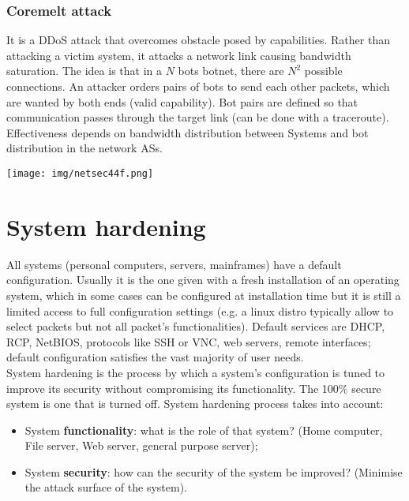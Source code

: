 \documentclass[a4paper, 10pt, titlepage]{article}
\begin{document}
\subsubsection*{Coremelt attack}
It is a DDoS attack that overcomes obstacle posed by capabilities. Rather than attacking a victim system, it attacks a network link causing bandwidth saturation. The idea is that in a $N$ bots botnet, there are $N^2$ possible connections. An attacker orders pairs of bots to send each other packets, which are wanted by both ends (valid capability). Bot pairs are defined so that communication passes through the target link (can be done with a traceroute).
Effectiveness depends on bandwidth distribution between Systems and bot distribution in the network ASs.
\begin{center}
	\texttt{[image: img/netsec44f.png]}
\end{center}

\newpage
\section{System hardening}
All systems (personal computers, servers, mainframes) have a default configuration. Usually it is the one given with a fresh installation of an operating system, which in some cases can be configured at installation time but it is still a limited access to full configuration settings (e.g. a linux distro typically allow to select packets but not all packet's functionalities). Default services are DHCP, RCP, NetBIOS, protocols like SSH or VNC, web servers, remote interfaces; default configuration satisfies the vast majority of user
needs. \\
System hardening is the process by which a system’s configuration is tuned to improve its security without compromising its functionality. The 100\% secure system is one that is turned off. System hardening process takes into account:
\begin{itemize}
	\item System \textbf{functionality}: what is the role of that system? (Home computer, File server, Web server, general purpose server);
	\item System \textbf{security}: how can the security of the system be
	improved? (Minimise the attack surface of the system).
\end{itemize}
\end{document}
